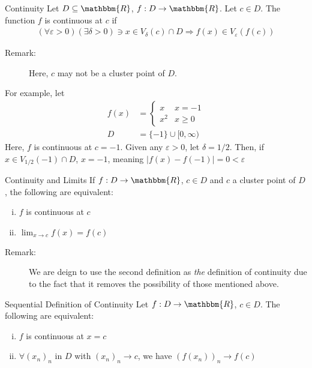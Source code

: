 \documentclass[10pt]{extarticle}
\newcommand{\R}{\mathbbm{R}}
\begin{document}
  \begin{problem}{Continuity}
    Let $D\subseteq \R$, $f: D\rightarrow \R$. Let $c\in D$. The function $f$ is continuous at $c$ if
    \begin{align*}
      (\forall \varepsilon > 0)(\exists \delta > 0) \ni x\in V_{\delta}(c) \cap D \Rightarrow f(x) \in V_{\varepsilon}(f(c))
    \end{align*}
    \begin{description}
      \item[Remark:] Here, $c$ may not be a cluster point of $D$.
    \end{description}
    For example, let
    \begin{align*}
      f(x) &= \begin{cases}
        x & x = -1\\
        x^2 & x \geq 0
      \end{cases}\\
        D &= \{-1\} \cup [0,\infty)
    \end{align*}
    Here, $f$ is continuous at $c = -1$. Given any $\varepsilon > 0$, let $\delta = 1/2$. Then, if $x\in V_{1/2}(-1)\cap D$, $x = -1$, meaning $|f(x) - f(-1)| = 0 < \varepsilon$
  \end{problem}
  \begin{problem}{Continuity and Limits}
    If $f: D\rightarrow \R$, $c\in D$ and $c$ a cluster point of $D$, the following are equivalent:
    \begin{enumerate}[(i)]
      \item $f$ is continuous at $c$
      \item $\lim_{x\rightarrow c} f(x) = f(c)$
    \end{enumerate}
    \begin{description}
      \item[Remark:] We are deign to use the second definition as \textit{the} definition of continuity due to the fact that it removes the possibility of those mentioned above.
    \end{description}
  \end{problem}
  \begin{problem}{Sequential Definition of Continuity}
    Let $f:D\rightarrow \R$, $c\in D$. The following are equivalent:
    \begin{enumerate}[(i)]
      \item $f$ is continuous at $x = c$
      \item $\forall (x_n)_n$ in $D$ with $(x_n)_n \rightarrow c$, we have $(f(x_n))_n \rightarrow f(c)$
    \end{enumerate}
  \end{problem}
\end{document}
